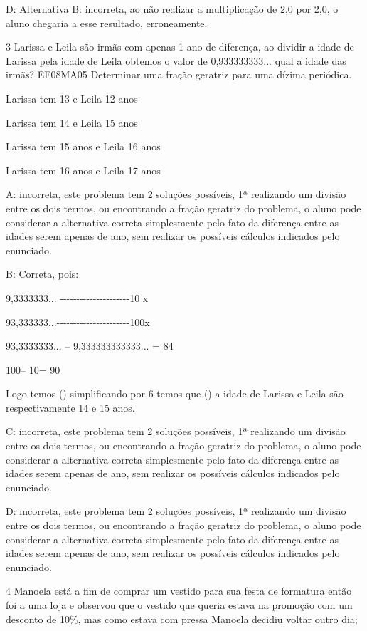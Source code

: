D: Alternativa B: incorreta, ao não realizar a multiplicação de 2,0 por
2,0, o aluno chegaria a esse resultado, erroneamente.

\num{3} Larissa e Leila são irmãs com apenas 1 ano de diferença, ao dividir a
idade de Larissa pela idade de Leila obtemos o valor de 0,933333333...
qual a idade das irmãs? EF08MA05 Determinar uma fração geratriz para uma
dízima periódica.

\item Larissa tem 13 e Leila 12 anos
\item Larissa tem 14 e Leila 15 anos
\item Larissa tem 15 anos e Leila 16 anos
\item Larissa tem 16 anos e Leila 17 anos

A: incorreta, este problema tem 2 soluções possíveis, 1ª realizando um
divisão entre os dois termos, ou encontrando a fração geratriz do
problema, o aluno pode considerar a alternativa correta simplesmente
pelo fato da diferença entre as idades serem apenas de ano, sem realizar
os possíveis cálculos indicados pelo enunciado.

B: Correta, pois:

9,3333333...
-\/-\/-\/-\/-\/-\/-\/-\/-\/-\/-\/-\/-\/-\/-\/-\/-\/-\/-\/-\/-10 x

93,333333...-\/-\/-\/-\/-\/-\/-\/-\/-\/-\/-\/-\/-\/-\/-\/-\/-\/-\/-\/-\/-\/-100x

93,3333333... -- 9,333333333333... = 84

100\times -- 10\times = 90

Logo temos () simplificando por 6 temos que
() a idade de Larissa e Leila são respectivamente 14 e 15
anos.

C: incorreta, este problema tem 2 soluções possíveis, 1ª realizando um
divisão entre os dois termos, ou encontrando a fração geratriz do
problema, o aluno pode considerar a alternativa correta simplesmente
pelo fato da diferença entre as idades serem apenas de ano, sem realizar
os possíveis cálculos indicados pelo enunciado.

D: incorreta, este problema tem 2 soluções possíveis, 1ª realizando um
divisão entre os dois termos, ou encontrando a fração geratriz do
problema, o aluno pode considerar a alternativa correta simplesmente
pelo fato da diferença entre as idades serem apenas de ano, sem realizar
os possíveis cálculos indicados pelo enunciado.

\num{4} Manoela está a fim de comprar um vestido para sua festa de formatura
então foi a uma loja e observou que o vestido que queria estava na
promoção com um desconto de 10\%, mas como estava com pressa Manoela
decidiu voltar outro dia;

